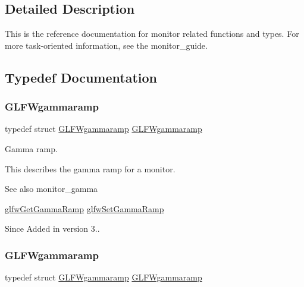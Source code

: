 \subsection{Detailed Description}
This is the reference documentation for monitor related functions and types. For more task-\/oriented information, see the monitor\+\_\+guide. 

\subsection{Typedef Documentation}
\mbox{\label{group__monitor_gaec0bd37af673be8813592849f13e02f0}} 
\subsubsection{\texorpdfstring{G\+L\+F\+Wgammaramp}{GLFWgammaramp}\hspace{0.1cm}{\footnotesize\ttfamily [1/5]}}
{\footnotesize\ttfamily typedef struct \hyperlink{structGLFWgammaramp}{G\+L\+F\+Wgammaramp}  \hyperlink{structGLFWgammaramp}{G\+L\+F\+Wgammaramp}}



Gamma ramp. 

This describes the gamma ramp for a monitor.

\begin{DoxySeeAlso}{See also}
monitor\+\_\+gamma 

\hyperlink{group__monitor_gafe7b41852c1a14fe978f0e5381969885}{glfw\+Get\+Gamma\+Ramp} \hyperlink{group__monitor_gac9f36a1cfa10eab191d3029ea8bc9558}{glfw\+Set\+Gamma\+Ramp}
\end{DoxySeeAlso}
\begin{DoxySince}{Since}
Added in version 3.. 
\end{DoxySince}
\mbox{\label{group__monitor_gaec0bd37af673be8813592849f13e02f0}} 
\subsubsection{\texorpdfstring{G\+L\+F\+Wgammaramp}{GLFWgammaramp}\hspace{0.1cm}{\footnotesize\ttfamily [2/5]}}
{\footnotesize\ttfamily typedef struct \hyperlink{structGLFWgammaramp}{G\+L\+F\+Wgammaramp}  \hyperlink{structGLFWgammaramp}{G\+L\+F\+Wgammaramp}}



